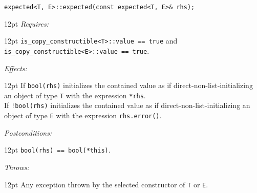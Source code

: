 \documentclass[a4paper,10pt]{article}
\newcommand{\cpp}[1]{\lstinline{#1}}
\newcommand{\wordingItem}[1]{\noindent\textit{#1:}}
\newenvironment{wordingTextItem}[1]{\wordingItem{#1}\vspace{7pt}\noindent\begin{adjustwidth}{12pt}{}}{\vspace{7pt}\end{adjustwidth}}
\newenvironment{wordingPara}{\begin{adjustwidth}{12pt}{}}{\end{adjustwidth}}
\begin{document}
\begin{lstlisting}[xleftmargin=0pt]
expected<T, E>::expected(const expected<T, E>& rhs);
\end{lstlisting}
\begin{wordingPara}
\begin{wordingTextItem}{Requires} \cpp{is_copy_constructible<T>::value == true} and\\
\cpp{is_copy_constructible<E>::value == true}.
\end{wordingTextItem}
\begin{wordingTextItem}{Effects}
If \cpp{bool(rhs)} initializes the contained value as if direct-non-list-initializing an object of type \cpp{T} with the expression \cpp{*rhs}.\\

\noindent
If \cpp{!bool(rhs)} initializes the contained value as if direct-non-list-initializing an object of type \cpp{E} with the expression \cpp{rhs.error()}.
\end{wordingTextItem}
\begin{wordingTextItem}{Postconditions}
\cpp{bool(rhs) == bool(*this)}.
\end{wordingTextItem}
\begin{wordingTextItem}{Throws}
Any exception thrown by the selected constructor of \cpp{T} or \cpp{E}.
\end{wordingTextItem}
\end{wordingPara}
\end{document}
